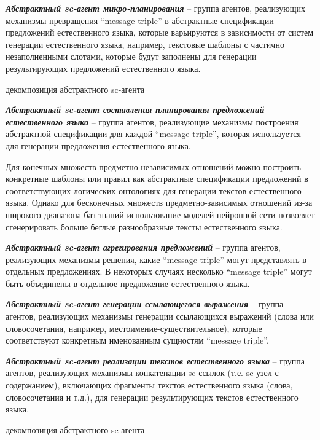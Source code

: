 \textit{\textbf{Абстрактный sc-агент микро-планирования}} -- группа агентов, реализующих механизмы превращения ``message triple'' в абстрактные спецификации предложений естественного языка, которые варьируются в зависимости от систем генерации естественного языка, например, текстовые шаблоны с частично незаполненными слотами, которые будут заполнены для генерации результирующих предложений естественного языка.
\begin{SCn}
	\begin{scnrelfromset}{декомпозиция абстрактного sc-агента}
	\end{scnrelfromset}
\end{SCn}

\textit{\textbf{Абстрактный sc-агент составления планирования предложений естественного языка}} -- группа агентов, реализующие механизмы построения абстрактной спецификации для каждой ``message triple'', которая используется для генерации предложения естественного языка.

Для конечных множеств предметно-независимых отношений можно построить конкретные шаблоны или правил как абстрактные спецификации предложений в соответствующих логических онтологиях для генерации текстов естественного языка. Однако для бесконечных множеств предметно-зависимых отношений из-за широкого диапазона баз знаний использование моделей нейронной сети позволяет сгенерировать больше беглые разнообразные тексты естественного языка. 

\textit{\textbf{Абстрактный sc-агент агрегирования предложений}} -- группа агентов, реализующих механизмы решения, какие ``message triple'' могут представлять в отдельных предложениях. В некоторых случаях несколько ``message triple'' могут быть объединены в отдельное предложение естественного языка.

\textit{\textbf{Абстрактный sc-агент генерации ссылающегося выражения}} -- группа агентов, реализующих механизмы генерации ссылающихся выражений (слова или словосочетания, например, местоимение-существительное), которые соответствуют конкретным именованным сущностям ``message triple''.

\textit{\textbf{Абстрактный sc-агент реализации текстов естественного языка}} -- группа агентов, реализующих механизмы конкатенации sc-ссылок (т.е. sc-узел с содержанием), включающих фрагменты текстов естественного языка (слова, словосочетания и т.д.), для генерации результирующих текстов естественного языка. 
\begin{SCn}
	\begin{scnrelfromset}{декомпозиция абстрактного sc-агента}
	\end{scnrelfromset}
\end{SCn}

